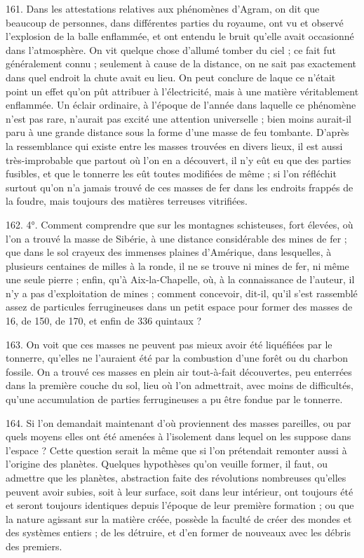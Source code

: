 \documentclass[a4paper, 11pt, oneside, polutonikogreek, french]{article}
\begin{document}
161. \og Dans les attestations relatives aux phénomènes d'Agram, on dit que beaucoup de personnes, dans différentes parties du royaume, ont vu et observé l'explosion de la balle enflammée, et ont entendu le bruit qu'elle avait occasionné dans l'atmosphère. On vit quelque chose d'allumé tomber du ciel ; ce fait fut généralement connu ; seulement à cause de la distance, on ne sait pas exactement dans quel endroit la chute avait eu lieu. On peut conclure de laque ce n'était point un effet qu'on pût attribuer à l'électricité, mais à une matière véritablement enflammée. Un éclair ordinaire, à l'époque de l'année dans laquelle ce phénomène n'est pas rare, n'aurait pas excité une attention universelle ; bien moins aurait-il paru à une grande distance sous la forme d'une masse de feu tombante. D'après la ressemblance qui existe entre les masses trouvées en divers lieux, il est aussi très-improbable que partout où l'on en a découvert, il n'y eût eu que des parties fusibles, et que le tonnerre les eût toutes modifiées de même ; si l'on réfléchit surtout qu'on n'a jamais trouvé de ces masses de fer dans les endroits frappés de la foudre, mais toujours des matières terreuses vitrifiées. \fg

162. 4°. \og Comment comprendre que sur les montagnes schisteuses, fort élevées, où l'on a trouvé la masse de Sibérie, à une distance considérable des mines de fer ; que dans le sol crayeux des immenses plaines d'Amérique, dans lesquelles, à plusieurs centaines de milles à la ronde, il ne se trouve ni mines de fer, ni même une seule pierre ; enfin, qu'à Aix-la-Chapelle, où, à la connaissance de l'auteur, il n'y a pas d'exploitation de mines ; comment concevoir, dit-il, qu'il s'est rassemblé assez de particules ferrugineuses dans un petit espace pour former des masses de 16, de 150, de 170, et enfin de 336 quintaux ? \fg

163. \og On voit que ces masses ne peuvent pas mieux avoir été liquéfiées par le tonnerre, qu'elles ne l'auraient été par la combustion d'une forêt ou du charbon fossile. On a trouvé ces masses en plein air tout-à-fait découvertes, peu enterrées dans la première couche du sol, lieu où l'on admettrait, avec moins de difficultés, qu'une accumulation de parties ferrugineuses a pu être fondue par le tonnerre. \fg

164. \og Si l'on demandait maintenant d'où proviennent des masses pareilles, ou par quels moyens elles ont été amenées à l'isolement dans lequel on les suppose dans l'espace ? Cette question serait la même que si l'on prétendait remonter aussi à l'origine des planètes. Quelques hypothèses qu'on veuille former, il faut, ou admettre que les planètes, abstraction faite des révolutions nombreuses qu'elles peuvent avoir subies, soit à leur surface, soit dans leur intérieur, ont toujours été et seront toujours identiques depuis l'époque de leur première formation ; ou que la nature agissant sur la matière créée, possède la faculté de créer des mondes et des systèmes entiers ; de les détruire, et d'en former de nouveaux avec les débris des premiers. \fg
\end{document}
